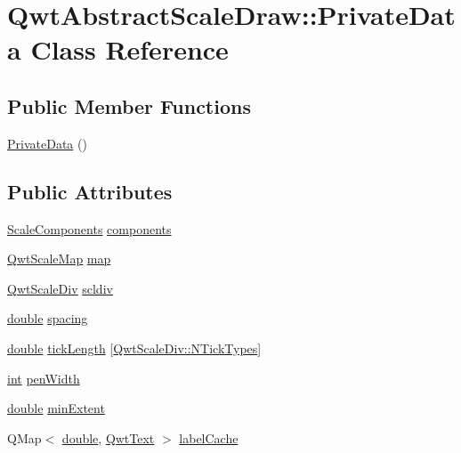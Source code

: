 \hypertarget{class_qwt_abstract_scale_draw_1_1_private_data}{\section{Qwt\-Abstract\-Scale\-Draw\-:\-:Private\-Data Class Reference}
\label{class_qwt_abstract_scale_draw_1_1_private_data}
}
\subsection*{Public Member Functions}
\begin{DoxyCompactItemize}
\item 
\hyperlink{class_qwt_abstract_scale_draw_1_1_private_data_a4400d2a4abc6308a3ff716fadce76072}{Private\-Data} ()
\end{DoxyCompactItemize}
\subsection*{Public Attributes}
\begin{DoxyCompactItemize}
\item 
\hyperlink{class_qwt_abstract_scale_draw_a0dd3ccdfa074fb6b1781b84ed2a4729a}{Scale\-Components} \hyperlink{class_qwt_abstract_scale_draw_1_1_private_data_a357e301a3aa8b139d12ec4440d762465}{components}
\item 
\hyperlink{class_qwt_scale_map}{Qwt\-Scale\-Map} \hyperlink{class_qwt_abstract_scale_draw_1_1_private_data_ac9fc2006eee367798cf851e74d8e8c49}{map}
\item 
\hyperlink{class_qwt_scale_div}{Qwt\-Scale\-Div} \hyperlink{class_qwt_abstract_scale_draw_1_1_private_data_abbdf0c43780e547a630a5b2ed0d42d6e}{scldiv}
\item 
\hyperlink{_super_l_u_support_8h_a8956b2b9f49bf918deed98379d159ca7}{double} \hyperlink{class_qwt_abstract_scale_draw_1_1_private_data_abd1795e03ded95386afb740f3fb9239a}{spacing}
\item 
\hyperlink{_super_l_u_support_8h_a8956b2b9f49bf918deed98379d159ca7}{double} \hyperlink{class_qwt_abstract_scale_draw_1_1_private_data_a9ae84ca2bea8f90a4b3b006909e614b6}{tick\-Length} \mbox{[}\hyperlink{class_qwt_scale_div_af21aedaa886dd5e067cf63505838736ca86796bbf72d5eb7162a924ba27ce6553}{Qwt\-Scale\-Div\-::\-N\-Tick\-Types}\mbox{]}
\item 
\hyperlink{ioapi_8h_a787fa3cf048117ba7123753c1e74fcd6}{int} \hyperlink{class_qwt_abstract_scale_draw_1_1_private_data_aced095ac3cc6aea1d7d4516b8eba27a7}{pen\-Width}
\item 
\hyperlink{_super_l_u_support_8h_a8956b2b9f49bf918deed98379d159ca7}{double} \hyperlink{class_qwt_abstract_scale_draw_1_1_private_data_a87d0e1aa52cf5e6b06462d229d7af2b2}{min\-Extent}
\item 
Q\-Map$<$ \hyperlink{_super_l_u_support_8h_a8956b2b9f49bf918deed98379d159ca7}{double}, \hyperlink{class_qwt_text}{Qwt\-Text} $>$ \hyperlink{class_qwt_abstract_scale_draw_1_1_private_data_af91fa7fd32ba72b14d042cdd5befd44a}{label\-Cache}
\end{DoxyCompactItemize}


